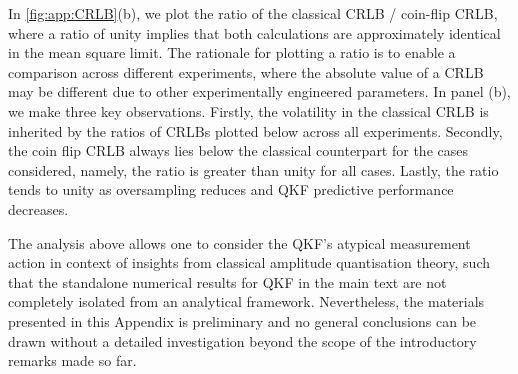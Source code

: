 In \cref{fig:app:CRLB}(b), we plot the ratio of the classical CRLB / coin-flip CRLB, where a ratio of unity implies that both calculations are approximately identical in the mean square limit. The rationale for plotting a ratio is to enable a comparison across different experiments, where the absolute value of a CRLB may be different due to other experimentally engineered parameters. In panel (b), we make three key observations. Firstly,  the volatility in the classical CRLB is inherited by the ratios of CRLBs plotted below across all experiments. Secondly, the coin flip CRLB always lies below the classical counterpart for the cases considered, namely, the ratio is greater than unity for all cases. Lastly, the ratio tends to unity as oversampling reduces and QKF predictive performance decreases.   

The analysis above allows one to consider the QKF's atypical measurement action in context of insights from classical amplitude quantisation theory, such that the standalone numerical results for QKF in the main text are not completely isolated from an analytical framework. Nevertheless, the materials presented in this Appendix is preliminary and no general conclusions can be drawn without a detailed investigation beyond the scope of the introductory remarks made so far. 

